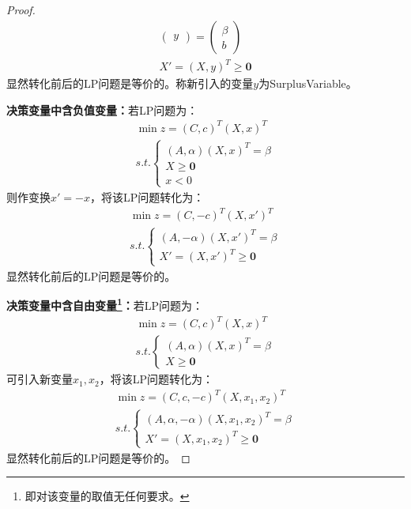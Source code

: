 \begin{proof}
\begin{gather*}
\begin{pmatrix}
			y
		\end{pmatrix}
		=
		\begin{pmatrix}
			\beta \\
			b
		\end{pmatrix} \\
		X'=(X,y)^T\geqslant\mathbf{0}
	\end{gather*}
	显然转化前后的LP问题是等价的。称新引入的变量$y$为\gls{SurplusVariable}。\par
	\textbf{决策变量中含负值变量：}若LP问题为：
	\begin{gather*}
		\min z=(C,c)^T(X,x)^T \\
		s.t.
		\begin{cases}
			(A,\alpha)(X,x)^T=\beta \\
			X\geqslant\mathbf{0} \\
			x<0
		\end{cases}
	\end{gather*}
	则作变换$x'=-x$，将该LP问题转化为：
	\begin{gather*}
		\min z=(C,-c)^T(X,x')^T \\
		s.t.
		\begin{cases}
			(A,-\alpha)(X,x')^T=\beta \\
			X'=(X,x')^T\geqslant\mathbf{0}
		\end{cases}
	\end{gather*}
	显然转化前后的LP问题是等价的。\par
	\textbf{决策变量中含自由变量\footnote{即对该变量的取值无任何要求。}：}若LP问题为：
	\begin{gather*}
		\min z=(C,c)^T(X,x)^T \\
		s.t.
		\begin{cases}
			(A,\alpha)(X,x)^T=\beta \\
			X\geqslant\mathbf{0}
		\end{cases}
	\end{gather*}
	可引入新变量$x_1,x_2$，将该LP问题转化为：
	\begin{gather*}
		\min z=(C,c,-c)^T(X,x_1,x_2)^T \\
		s.t.
		\begin{cases}
			(A,\alpha,-\alpha)(X,x_1,x_2)^T=\beta \\
			X'=(X,x_1,x_2)^T\geqslant\mathbf{0}
		\end{cases}
	\end{gather*}
	显然转化前后的LP问题是等价的。
\end{proof}
